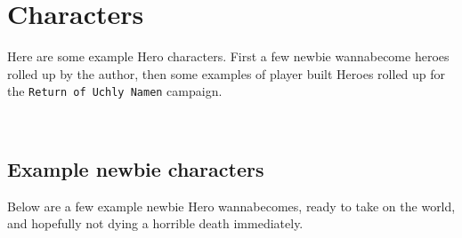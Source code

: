 

\cleardoublepage

\chapter*{Characters}
\label{cpt:characters}

Here are some example Hero characters. First a few newbie wannabecome heroes rolled up by the author, then some examples of player built Heroes rolled up for the \texttt{Return of Uchly Namen} campaign.


\

\goodbreak
{} {}
\section*{Example newbie characters}

Below are a few example newbie Hero wannabecomes, ready to take on the world, and hopefully not dying a horrible death immediately.

%
%






